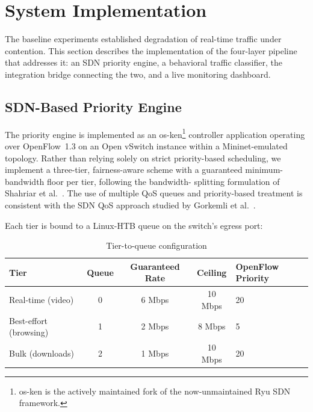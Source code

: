%

\section{System Implementation}
\label{sec:implementation}

The baseline experiments established degradation of real-time traffic under
contention. This section describes the implementation of the four-layer
pipeline that
addresses it: an SDN priority engine, a behavioral traffic classifier, the
integration bridge connecting the two, and a live monitoring dashboard.

\subsection{SDN-Based Priority Engine}
\label{subsec:priority-engine}

The priority engine is implemented as an os-ken\footnote{os-ken is the
actively maintained fork of the now-unmaintained Ryu SDN framework.}
controller application operating over OpenFlow~1.3 on an Open vSwitch
instance within a Mininet-emulated topology. Rather than relying solely on
strict priority-based scheduling, we implement a three-tier, fairness-aware scheme
with a guaranteed minimum-bandwidth floor per tier, following the bandwidth-
splitting formulation of Shahriar et al.~\cite{shahriar2024}. The use of
multiple QoS queues and priority-based treatment is consistent with the SDN
QoS approach studied by Gorkemli et al.~\cite{gorkemli2015}.

Each tier is bound to a Linux-HTB queue on the switch's egress port:

\begin{table}[h]
\centering
\caption{Tier-to-queue configuration}
\label{tab:queue_configuration}
\begin{tabular}{lcccl}
\hline
\textbf{Tier} & \textbf{Queue} & \textbf{Guaranteed Rate}
& \textbf{Ceiling} & \textbf{OpenFlow Priority} \\
\hline
Real-time (video) & 0 & 6 Mbps & 10 Mbps & 20 \\
Best-effort (browsing) & 1 & 2 Mbps & 8 Mbps & 5 \\
Bulk (downloads) & 2 & 1 Mbps & 10 Mbps & 20 \\
\hline
\end{tabular}
\end{table}

